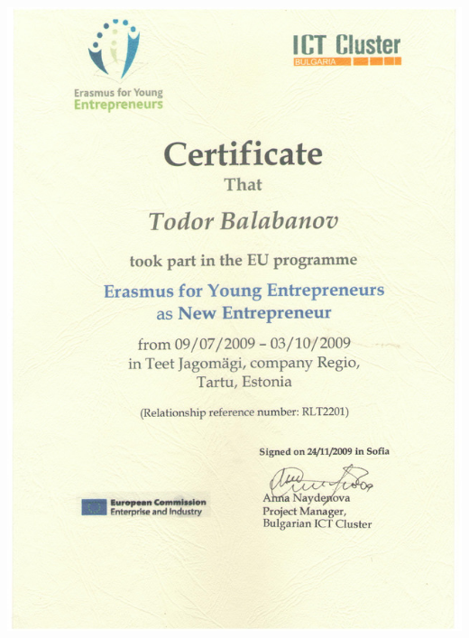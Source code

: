 \documentclass[bulgarian,a4paper]{europasscv}
\begin{document}
\includegraphics[width=\textwidth,height=\textheight,keepaspectratio]{EYE2009}
\end{document}
